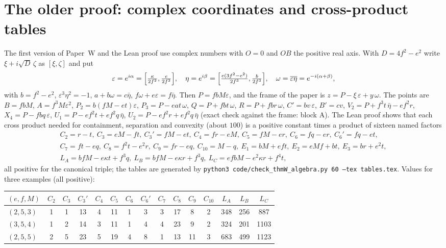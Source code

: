 \documentclass[11pt,reqno]{amsart}
\begin{document}
\section{The older proof: complex coordinates and cross-product tables}
The first version of Paper~W and the Lean proof use complex numbers with $O=0$ and $OB$ the positive real axis. With $D=4f^2-e^2$ write $\xi+i\sqrt D\,\zeta$ as $[\xi,\zeta]$ and put
\[
\varepsilon=e^{i\alpha}=\Bigl[\tfrac{\kappa}{2f^2},\tfrac{e}{2f^2}\Bigr],\quad
\eta=e^{i\beta}=\Bigl[\tfrac{e(3f^2-e^2)}{2f^3},\tfrac{b}{2f^3}\Bigr],\quad \omega=\overline{\varepsilon\eta}=e^{-i(\alpha+\beta)},
\]
with $b=f^2-e^2$, $\varepsilon^3\eta^2=-1$, $a+b\omega=c\bar\eta$, $f\omega+e\varepsilon=f\bar\eta$. Then $P=fbM\varepsilon$, and the frame of the paper is $z=P-\xi\,\varepsilon+y\,\omega$. The points are $B=fbM$, $A=f^3M\varepsilon^2$, $P_2=b(fM-et)\varepsilon$, $P_3=P-eat\,\omega$, $Q=P+fbt\,\omega$, $R=P+fbr\,\omega$, $C'=bv\,\varepsilon$, $B'=cv$, $V_2=P+f^3t\,\bar\eta-ef^2r$, $X_4=P-fbq\,\varepsilon$, $U_1=P-ef^2t+ef^2q\,\bar\eta$, $U_2=P-ef^2r+ef^2q\,\bar\eta$ (exact check against the frame: block A). The Lean proof shows that each cross product needed for containment, separation and convexity (about $100$) is a positive constant times a product of sixteen named factors
\begin{gather*}
C_2=r-t,\ C_3=eM-ft,\ C_3'=fM-et,\ C_4=fr-eM,\ C_5=fM-er,\ C_6=fq-er,\ C_6'=fq-et,\\
C_7=ft-eq,\ C_8=f^2t-e^2r,\ C_9=fr-eq,\ C_{10}=M-q,\ E_1=bM+eft,\ E_2=eMf+bt,\ E_3=br+e^2t,\\
L_A=bfM-e\kappa t+f^3q,\ L_B=bfM-e\kappa r+f^3q,\ L_C=efbM-e^2\kappa r+f^4t,
\end{gather*}
all positive for the canonical triple; the tables are generated by \texttt{python3 code/check\_thmW\_algebra.py 60 --tex tables.tex}. Values for three examples (all positive):
\begin{center}\small
\begin{tabular}{@{}lcccccccccccccc@{}}
\toprule
$(e,f,M)$ & $C_2$ & $C_3$ & $C_3'$ & $C_4$ & $C_5$ & $C_6$ & $C_6'$ & $C_7$ & $C_8$ & $C_9$ & $C_{10}$ & $L_A$ & $L_B$ & $L_C$\\
\midrule
$(2,5,3)$ & 1 & 1 & 13 & 4 & 11 & 1 & 3 & 3 & 17 & 8 & 2 & 348 & 256 & 887\\
$(3,5,4)$ & 1 & 2 & 14 & 3 & 11 & 1 & 4 & 4 & 23 & 9 & 2 & 324 & 201 & 1103\\
$(2,5,5)$ & 2 & 5 & 23 & 5 & 19 & 4 & 8 & 1 & 13 & 11 & 3 & 683 & 499 & 1123\\
\bottomrule
\end{tabular}
\end{center}
\end{document}

